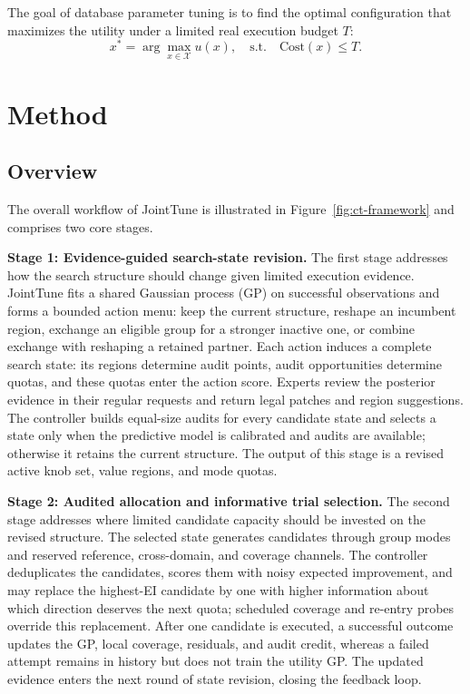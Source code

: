 \documentclass[runningheads]{llncs}
\begin{document}
The goal of database parameter tuning is to find the optimal configuration that maximizes the utility under a limited real execution budget \(T\):
\begin{equation}
x^* = \arg\max_{x \in \mathcal{X}} u(x), \quad \text{s.t.} \quad \text{Cost}(x) \le T.
\end{equation}

\section{Method}\label{sec:method}

\subsection{Overview}\label{sec:overview}

The overall workflow of JointTune is illustrated in
Figure~\ref{fig:ct-framework} and comprises two core stages.

\noindent\textbf{Stage 1: Evidence-guided search-state revision.}
The first stage addresses how the search structure should change given
limited execution evidence. JointTune fits a shared Gaussian process (GP)
on successful observations and forms a bounded action menu: keep the
current structure, reshape an incumbent region, exchange an eligible group
for a stronger inactive one, or combine exchange with reshaping a retained
partner. Each action induces a complete search state: its regions determine
audit points, audit opportunities determine quotas, and these quotas enter
the action score. Experts review the posterior evidence in their regular
requests and return legal patches and region suggestions. The controller
builds equal-size audits for every candidate state and selects a state only
when the predictive model is calibrated and audits are available; otherwise
it retains the current structure. The output of this stage is a revised
active knob set, value regions, and mode quotas.

\noindent\textbf{Stage 2: Audited allocation and informative trial selection.}
The second stage addresses where limited candidate capacity should be
invested on the revised structure. The selected state generates candidates
through group modes and reserved reference, cross-domain, and coverage
channels. The controller deduplicates the candidates, scores them with
noisy expected improvement, and may replace the highest-EI candidate by one
with higher information about which direction deserves the next quota;
scheduled coverage and re-entry probes override this replacement. After one
candidate is executed, a successful outcome updates the GP, local coverage,
residuals, and audit credit, whereas a failed attempt remains in history but
does not train the utility GP. The updated evidence enters the next round of
state revision, closing the feedback loop.
\end{document}
